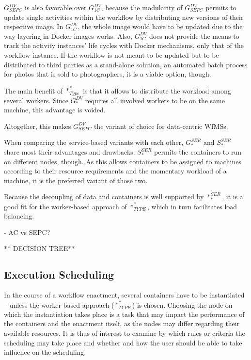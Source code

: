  $G_{SEPC}^{DV}$ is also favorable over $G_{1C}^{DV}$, because the modularity of $G_{SEPC}^{DV}$ permits to update single activities within the workflow by distributing new versions of their respective image. In $G_{1C}^{DV}$, the whole image would have to be updated due to the way layering in Docker images works. Also, $G_{1C}^{DV}$ does not provide the means to track the activity instances' life cycles with Docker mechanisms, only that of the workflow instance. If the workflow is not meant to be updated but to be distributed to third parties as a stand-alone solution, \eg an automated batch process for photos that is sold to photographers, it is a viable option, though.

  The main benefit of $*_{Type}^{*}$ is that it allows to distribute the workload among several workers. Since $G_{*}^{DV}$ requires all involved workers to be on the same machine, this advantage is voided.

  Altogether, this makes $G_{SEPC}^{DV}$ the variant of choice for data-centric \acp{WfMS}.

  When comparing the service-based variants with each other, $G_{*}^{SER}$ and $S_{*}^{SER}$ share most their advantages and drawbacks. $S_{*}^{SER}$ permits the containers to run on different nodes, though. As this allows containers to be assigned to machines according to their resource requirements and the momentary workload of a machine, it is the preferred variant of those two.

  Because the decoupling of data and containers is well supported by $*_{*}^{SER}$, it is a good fit for the worker-based approach of $*_{TYPE}^{*}$, which in turn facilitates load balancing.

    - AC vs SEPC?

  ** DECISION TREE**


\subsection{Execution Scheduling} %
\label{sub:execution_scheduling}
  In the course of a workflow enactment, several containers have to be instantiated -- unless the worker-based approach ($*_{TYPE}^{*}$) is chosen. Choosing the node on which the instantiation takes place is a task that may impact the performance of the containers and the enactment itself, as the nodes may differ regarding their available resources. It is thus of interest to examine by which rules or criteria the scheduling may take place and whether and how the user should be able to take influence on the scheduling.

